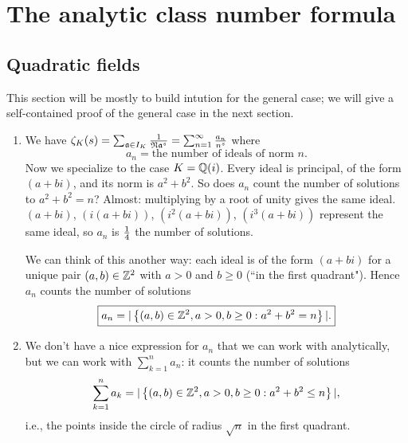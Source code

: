 \pagebreak

\section{The analytic class number formula}
\subsection{Quadratic fields}
This section will be mostly to build intution for the general case; we will give a self-contained proof of the general case in the next section.

\begin{enumerate}
\item
We have $\ze_K(s)=%
\sum_{\ma \in I_K} \rc{\fN \ma^s}=\sum_{n=1}^{\iy} \fc{a_n}{n^s}$ where 
\[a_n=\text{the number of ideals of norm }n.\]
Now we specialize to the case $K=\mathbb{Q}(i)$. Every ideal is principal, of the form $(a+bi)$, and its norm is $a^2+b^2$. So does $a_n$ count the number of solutions to $a^2+b^2=n$? Almost: multiplying by a root of unity gives the same ideal. $(a+bi)$, $(i(a+bi))$, $(i^2(a+bi))$, $(i^3(a+bi))$ represent the same ideal, so $a_n$ is $\frac{1}{4}$ the number of solutions. 

We can think of this another way: each ideal is of the form $(a+bi)$ for a unique pair $(a,b)\in \mathbb{Z}^2$ with $a>0$ and $b\ge 0$ (``in the first quadrant"). Hence $a_n$ counts the number of solutions
\[
\boxed{a_n=|\left\{{(a,b)\in \mathbb{Z}^2,a>0,b\ge 0}:{a^2+b^2=n}\right\}|.}
\]
\item 
We don't have a nice expression for $a_n$ that we can work with analytically, but we can work with $\sum_{k=1}^n a_n$: it counts the number of solutions
\[
\sum_{k=1}^n a_k=|\left\{{(a,b)\in \mathbb{Z}^2,a>0,b\ge 0}:{a^2+b^2\le n}\right\}|,
\]
i.e., the points inside the circle of radius $\sqrt n$ in the first quadrant.


\end{enumerate}
